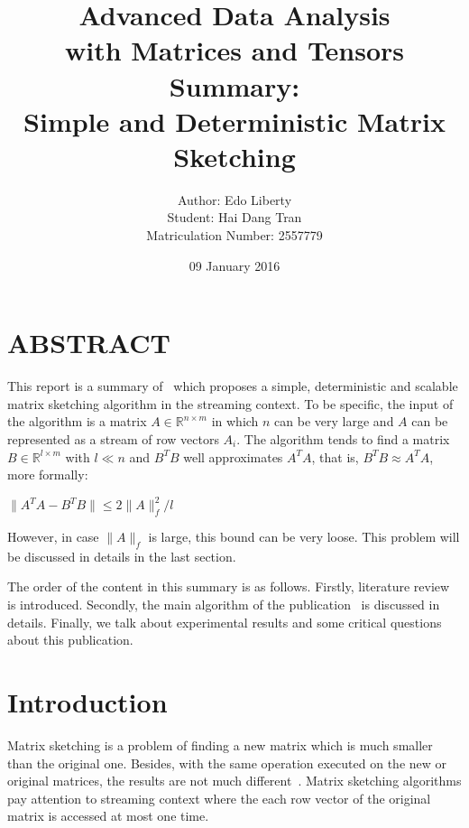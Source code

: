 \documentclass{acm_proc_article-sp}
\begin{document}
\title{Advanced Data Analysis\\with Matrices and Tensors Summary:\\Simple and Deterministic Matrix Sketching}
\author{
\alignauthor
Author: Edo Liberty\\Student: Hai Dang Tran\\Matriculation Number: 2557779
}
\date{09 January 2016}

\maketitle

\section*{ABSTRACT}
This report is a summary of~\cite{ref1} which proposes a simple, deterministic and scalable matrix sketching algorithm in the streaming context. To be specific, the input of the algorithm is a matrix $A \in \mathbb{R}^{n \times m}$ in which $n$ can be very large and $A$ can be represented as a stream of row vectors $A_{i}$. The algorithm tends to find a matrix $B \in \mathbb{R}^{l \times m}$ with $l \ll n$ and $B^TB$ well approximates $A^TA$, that is, $B^TB \approx A^TA$, more formally:

$\|A^TA - B^TB\| \leq 2\|A\|^2_{f} / l$

However, in case $\|A\|_{f}$ is large, this bound can be very loose. This problem will be discussed in details in the last section.

The order of the content in this summary is as follows. Firstly, literature review is introduced. Secondly, the main algorithm of the publication~\cite{ref1} is discussed in details. Finally, we talk about experimental results and some critical questions about this publication.\\

\section{Introduction}

Matrix sketching is a problem of finding a new matrix which is much smaller than the original one. Besides, with the same operation executed on the new or original matrices, the results are not much different~\cite{ref1}. Matrix sketching algorithms pay attention to streaming context where the each row vector of the original matrix is accessed at most one time.
\end{document}
